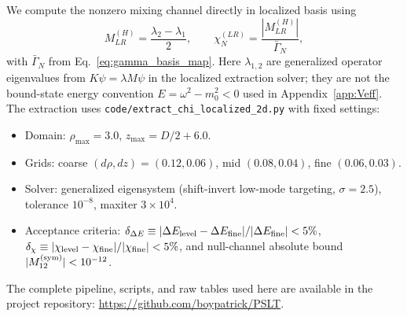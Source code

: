 \documentclass[aps,prd,onecolumn,notitlepage,nofootinbib,superscriptaddress,11pt,floatfix]{revtex4-2}
\begin{document}
We compute the nonzero mixing channel directly in localized basis using
\begin{equation}
M_{LR}^{(H)}=\frac{\lambda_2-\lambda_1}{2},\qquad
\chi_N^{(LR)}=\frac{|M_{LR}^{(H)}|}{\bar{\Gamma}_N},
\end{equation}
with $\bar{\Gamma}_N$ from Eq.~\eqref{eq:gamma_basis_map}. Here $\lambda_{1,2}$ are generalized operator eigenvalues from $K\psi=\lambda M\psi$ in the localized extraction solver; they are not the bound-state energy convention $E=\omega^2-m_0^2<0$ used in Appendix~\ref{app:Veff}. The extraction uses \texttt{code/extract\_chi\_localized\_2d.py} with fixed settings:
\begin{itemize}
\item Domain: $\rho_{\max}=3.0$, $z_{\max}=D/2+6.0$.
\item Grids: coarse $(d\rho,dz)=(0.12,0.06)$, mid $(0.08,0.04)$, fine $(0.06,0.03)$.
\item Solver: generalized eigensystem (shift-invert low-mode targeting, $\sigma=2.5$), tolerance $10^{-8}$, maxiter $3\times10^4$.
\item Acceptance criteria: $\delta_{\Delta E}\equiv |\Delta E_{\rm level}-\Delta E_{\rm fine}|/|\Delta E_{\rm fine}|<5\%$, $\delta_{\chi}\equiv |\chi_{\rm level}-\chi_{\rm fine}|/|\chi_{\rm fine}|<5\%$, and null-channel absolute bound $|M_{12}^{\rm(sym)}|<10^{-12}$.
\end{itemize}
The complete pipeline, scripts, and raw tables used here are available in the project repository: \url{https://github.com/boypatrick/PSLT}.
\end{document}
